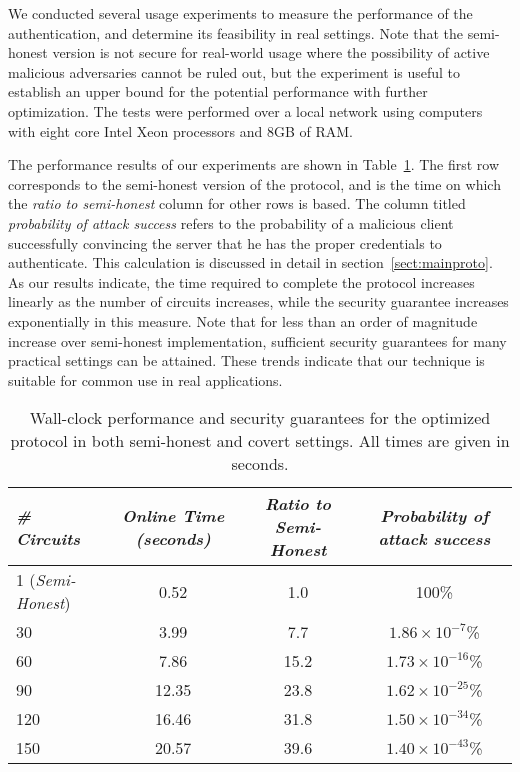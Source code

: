 We conducted several usage experiments to measure the performance of
the authentication, and determine its feasibility in real
settings. Note that the semi-honest version is not secure for
real-world usage where the possibility of active malicious adversaries
cannot be ruled out, but the experiment is useful to establish an
upper bound for the potential performance with further
optimization. The tests were performed over a local network using
computers with eight core Intel Xeon processors and 8GB of RAM.

The performance results of our experiments are shown in
Table~\ref{table:performance}. The first row corresponds to the
semi-honest version of the protocol, and is the time on which the
\emph{ratio to semi-honest} column for other rows is based. The column
titled \emph{probability of attack success} refers to the probability
of a malicious client successfully convincing the server that he has
the proper credentials to authenticate. This calculation is discussed
in detail in section~\ref{sect:mainproto}. As our results indicate,
the time required to complete the protocol increases linearly as the
number of circuits increases, while the security guarantee increases
exponentially in this measure. Note that for less than an order of
magnitude increase over semi-honest implementation, sufficient
security guarantees for many practical settings can be attained. These
trends indicate that our technique is suitable for common use in real
applications.

\begin{table}[t]
\centering
\begin{tabular}{|l|c|c|c|}
\hline
{\it \# Circuits} & {\it Online Time (seconds)} & {\it Ratio to
Semi-Honest} & {\it Probability of attack success} \\
\hline\hline
1 ({\it Semi-Honest}) & 0.52 & 1.0 & 100\% \\
\hline
30 & 3.99 & 7.7 & $1.86 \times 10^{-7}$\% \\
\hline
60 & 7.86 & 15.2 & $1.73 \times 10^{-16}$\% \\
\hline
90 & 12.35 & 23.8 & $1.62 \times 10^{-25}$\% \\
\hline
120 & 16.46 & 31.8 & $1.50 \times 10^{-34}$\% \\
\hline
150 & 20.57 & 39.6 & $1.40 \times 10^{-43}$\% \\
\hline
\end{tabular}
\vspace{1em}
\caption{Wall-clock performance and security guarantees for the
optimized protocol in both semi-honest and covert settings. All times
are given in seconds.}
\label{table:performance}
\end{table}

